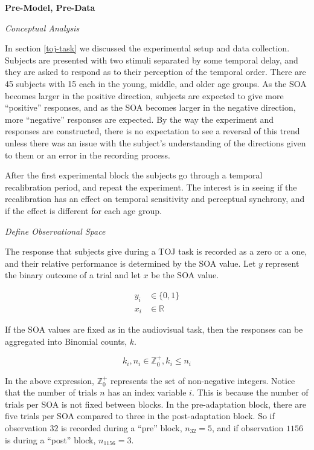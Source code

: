 \documentclass[11pt, oneside, openany]{scrbook}
\begin{document}
\textbf{Pre-Model, Pre-Data}

\emph{Conceptual Analysis}

In section \ref{toj-task} we discussed the experimental setup and data collection. Subjects are presented with two stimuli separated by some temporal delay, and they are asked to respond as to their perception of the temporal order. There are 45 subjects with 15 each in the young, middle, and older age groups. As the SOA becomes larger in the positive direction, subjects are expected to give more ``positive'' responses, and as the SOA becomes larger in the negative direction, more ``negative'' responses are expected. By the way the experiment and responses are constructed, there is no expectation to see a reversal of this trend unless there was an issue with the subject's understanding of the directions given to them or an error in the recording process.

After the first experimental block the subjects go through a temporal recalibration period, and repeat the experiment. The interest is in seeing if the recalibration has an effect on temporal sensitivity and perceptual synchrony, and if the effect is different for each age group.

\emph{Define Observational Space}

The response that subjects give during a TOJ task is recorded as a zero or a one, and their relative performance is determined by the SOA value. Let \(y\) represent the binary outcome of a trial and let \(x\) be the SOA value.


\begin{align*}
y_i &\in \lbrace 0, 1\rbrace \\
x_i &\in \mathbb{R}
\end{align*}

If the SOA values are fixed as in the audiovisual task, then the responses can be aggregated into Binomial counts, \(k\).

\[k_i, n_i \in \mathbb{Z}_0^+, k_i \le n_i\]

In the above expression, \(\mathbb{Z}_0^+\) represents the set of non-negative integers. Notice that the number of trials \(n\) has an index variable \(i\). This is because the number of trials per SOA is not fixed between blocks. In the pre-adaptation block, there are five trials per SOA compared to three in the post-adaptation block. So if observation \(32\) is recorded during a ``pre'' block, \(n_{32} = 5\), and if observation \(1156\) is during a ``post'' block, \(n_{1156} = 3\).
\end{document}
